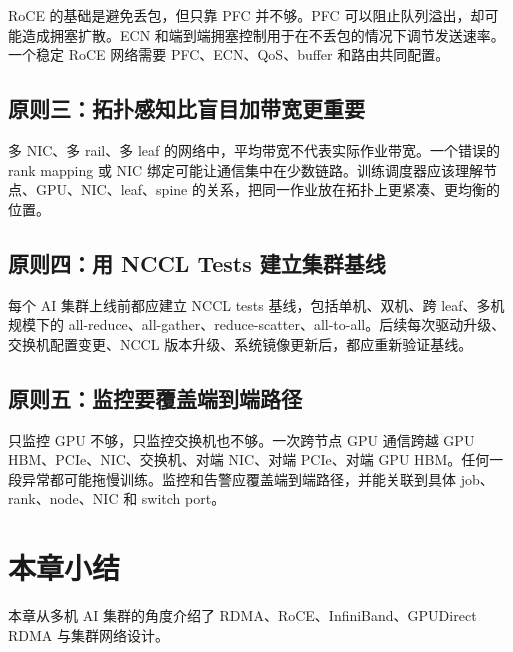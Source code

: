 RoCE 的基础是避免丢包，但只靠 PFC 并不够。PFC 可以阻止队列溢出，却可能造成拥塞扩散。ECN 和端到端拥塞控制用于在不丢包的情况下调节发送速率。一个稳定 RoCE 网络需要 PFC、ECN、QoS、buffer 和路由共同配置。

\subsection{原则三：拓扑感知比盲目加带宽更重要}
\label{subsec:principle-topology-aware-network}

多 NIC、多 rail、多 leaf 的网络中，平均带宽不代表实际作业带宽。一个错误的 rank mapping 或 NIC 绑定可能让通信集中在少数链路。训练调度器应该理解节点、GPU、NIC、leaf、spine 的关系，把同一作业放在拓扑上更紧凑、更均衡的位置。

\subsection{原则四：用 NCCL Tests 建立集群基线}
\label{subsec:principle-nccl-baseline}

每个 AI 集群上线前都应建立 NCCL tests 基线，包括单机、双机、跨 leaf、多机规模下的 all-reduce、all-gather、reduce-scatter、all-to-all。后续每次驱动升级、交换机配置变更、NCCL 版本升级、系统镜像更新后，都应重新验证基线。

\subsection{原则五：监控要覆盖端到端路径}
\label{subsec:principle-end-to-end-monitoring}

只监控 GPU 不够，只监控交换机也不够。一次跨节点 GPU 通信跨越 GPU HBM、PCIe、NIC、交换机、对端 NIC、对端 PCIe、对端 GPU HBM。任何一段异常都可能拖慢训练。监控和告警应覆盖端到端路径，并能关联到具体 job、rank、node、NIC 和 switch port。

\section{本章小结}
\label{sec:rdma-roce-summary}

本章从多机 AI 集群的角度介绍了 RDMA、RoCE、InfiniBand、GPUDirect RDMA 与集群网络设计。

